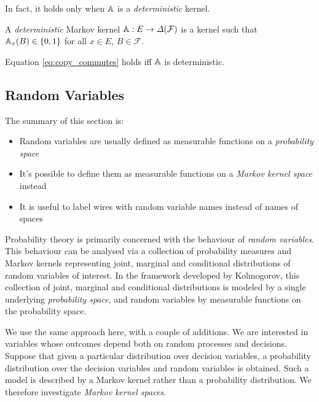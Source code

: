In fact, it holds only when $\mathbb{A}$ is a \emph{deterministic} kernel.

\begin{definition}
A \emph{deterministic} Markov kernel $\mathbb{A}:E\to \Delta(\mathcal{F})$ is a kernel such that $\mathbb{A}_x(B)\in\{0,1\}$ for all $x\in E$, $B\in\mathcal{F}$.
\end{definition}

\begin{theorem}
Equation \ref{eq:copy_commutes} holds iff $\mathbb{A}$ is deterministic.
\end{theorem}


\subsection{Random Variables}\label{ssec:random_variables}

The summary of this section is:
\begin{itemize}
\item Random variables are usually defined as measurable functions on a \emph{probability space}
\item It's possible to define them as measurable functions on a \emph{Markov kernel space} instead
\item It is useful to label wires with random variable names instead of names of spaces
\end{itemize}

Probability theory is primarily concerned with the behaviour of \emph{random variables}. This behaviour can be analysed via a collection of probability measures and Markov kernels representing joint, marginal and conditional distributions of random variables of interest. In the framework developed by Kolmogorov, this collection of joint, marginal and conditional distributions is modeled by a single underlying \emph{probability space}, and random variables by measurable functions on the probability space. 

We use the same approach here, with a couple of additions. We are interested in variables whose outcomes depend both on random processes and decisions. Suppose that given a particular distribution over decision variables, a probability distribution over the decision variables and random variables is obtained. Such a model is described by a Markov kernel rather than a probability distribution. We therefore investigate \emph{Markov kernel spaces}.

